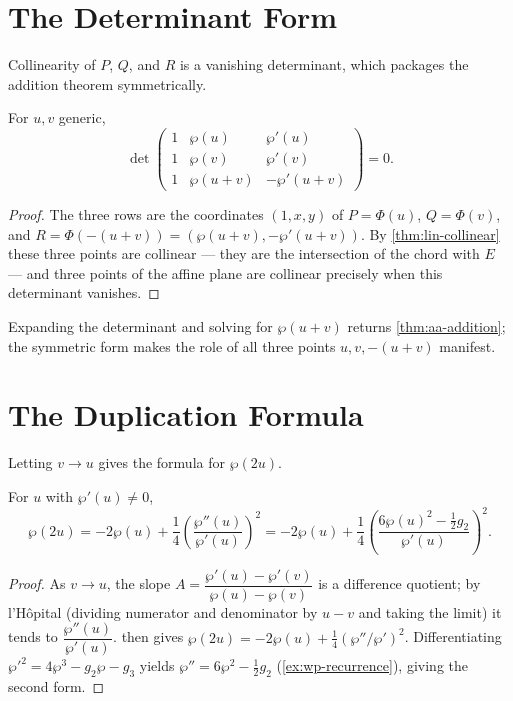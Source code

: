 \section{The Determinant Form}
\label{sec:aa-determinant}

Collinearity of \(P\), \(Q\), and \(R\) is a vanishing determinant, which packages
the addition theorem symmetrically.

\begin{proposition}
\label{prop:aa-determinant}
For \(u, v\) generic,
\[
  \det\begin{pmatrix}
    1 & \wp(u)   & \wp'(u) \\
    1 & \wp(v)   & \wp'(v) \\
    1 & \wp(u+v) & -\wp'(u+v)
  \end{pmatrix} = 0 .
\]
\end{proposition}

\begin{proof}
The three rows are the coordinates \((1, x, y)\) of \(P = \Phi(u)\),
\(Q = \Phi(v)\), and \(R = \Phi(-(u+v)) = (\wp(u+v), -\wp'(u+v))\). By
\cref{thm:lin-collinear} these three points are collinear --- they are the
intersection of the chord with \(E\) --- and three points of the affine plane are
collinear precisely when this determinant vanishes.
\end{proof}

Expanding the determinant and solving for \(\wp(u+v)\) returns
\cref{thm:aa-addition}; the symmetric form makes the role of all three points
\(u, v, -(u+v)\) manifest.

\section{The Duplication Formula}
\label{sec:aa-duplication}

Letting \(v \to u\) gives the formula for \(\wp(2u)\).

\begin{corollary}[Duplication]
\label{cor:aa-duplication}
For \(u\) with \(\wp'(u) \ne 0\),
\[
  \wp(2u) = -2\wp(u) + \frac14\left( \frac{\wp''(u)}{\wp'(u)} \right)^2
          = -2\wp(u) + \frac14\left( \frac{6\wp(u)^2 - \tfrac12 g_2}{\wp'(u)} \right)^2 .
\]
\end{corollary}

\begin{proof}
As \(v \to u\), the slope \(A = \dfrac{\wp'(u) - \wp'(v)}{\wp(u) - \wp(v)}\) is a
difference quotient; by l'H\^opital (dividing numerator and denominator by
\(u - v\) and taking the limit) it tends to \(\dfrac{\wp''(u)}{\wp'(u)}\).
 then gives \(\wp(2u) = -2\wp(u) + \tfrac14(\wp''/\wp')^2\).
Differentiating \(\wp'^2 = 4\wp^3 - g_2\wp - g_3\) yields \(\wp'' = 6\wp^2 -
\tfrac12 g_2\) (\cref{ex:wp-recurrence}), giving the second form.
\end{proof}

